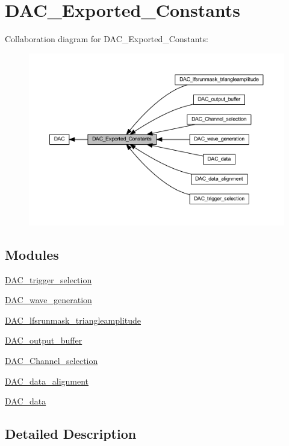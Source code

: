 \hypertarget{group___d_a_c___exported___constants}{}\section{D\+A\+C\+\_\+\+Exported\+\_\+\+Constants}
\label{group___d_a_c___exported___constants}
Collaboration diagram for D\+A\+C\+\_\+\+Exported\+\_\+\+Constants\+:
\nopagebreak
\begin{figure}[H]
\begin{center}
\leavevmode
\includegraphics[width=350pt]{group___d_a_c___exported___constants}
\end{center}
\end{figure}
\subsection*{Modules}
\begin{DoxyCompactItemize}
\item 
\hyperlink{group___d_a_c__trigger__selection}{D\+A\+C\+\_\+trigger\+\_\+selection}
\item 
\hyperlink{group___d_a_c__wave__generation}{D\+A\+C\+\_\+wave\+\_\+generation}
\item 
\hyperlink{group___d_a_c__lfsrunmask__triangleamplitude}{D\+A\+C\+\_\+lfsrunmask\+\_\+triangleamplitude}
\item 
\hyperlink{group___d_a_c__output__buffer}{D\+A\+C\+\_\+output\+\_\+buffer}
\item 
\hyperlink{group___d_a_c___channel__selection}{D\+A\+C\+\_\+\+Channel\+\_\+selection}
\item 
\hyperlink{group___d_a_c__data__alignment}{D\+A\+C\+\_\+data\+\_\+alignment}
\item 
\hyperlink{group___d_a_c__data}{D\+A\+C\+\_\+data}
\end{DoxyCompactItemize}


\subsection{Detailed Description}
